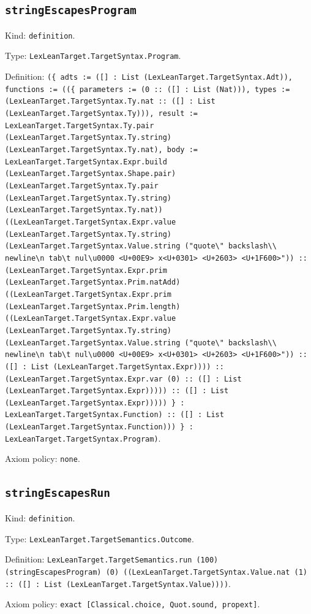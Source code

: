 \documentclass[11pt]{article}
\begin{document}
\subsection*{\texttt{stringEscapesProgram}}
\noindent Kind: \texttt{definition}.\par
\noindent Type: \texttt{LexLeanTarget.TargetSyntax.Program}.\par
\noindent Definition: \texttt{(\{ adts := ([] : List (LexLeanTarget.TargetSyntax.Adt)), functions := ((\{ parameters := (0 :: ([] : List (Nat))), types := (LexLeanTarget.TargetSyntax.Ty.nat :: ([] : List (LexLeanTarget.TargetSyntax.Ty))), result := LexLeanTarget.TargetSyntax.Ty.pair (LexLeanTarget.TargetSyntax.Ty.string) (LexLeanTarget.TargetSyntax.Ty.nat), body := LexLeanTarget.TargetSyntax.Expr.build (LexLeanTarget.TargetSyntax.Shape.pair) (LexLeanTarget.TargetSyntax.Ty.pair (LexLeanTarget.TargetSyntax.Ty.string) (LexLeanTarget.TargetSyntax.Ty.nat)) ((LexLeanTarget.TargetSyntax.Expr.value (LexLeanTarget.TargetSyntax.Ty.string) (LexLeanTarget.TargetSyntax.Value.string ("quote\textbackslash{}" backslash\textbackslash{}\textbackslash{} newline\textbackslash{}n tab\textbackslash{}t nul\textbackslash{}u0000 <U+00E9> x<U+0301> <U+2603> <U+1F600>")) :: (LexLeanTarget.TargetSyntax.Expr.prim (LexLeanTarget.TargetSyntax.Prim.natAdd) ((LexLeanTarget.TargetSyntax.Expr.prim (LexLeanTarget.TargetSyntax.Prim.length) ((LexLeanTarget.TargetSyntax.Expr.value (LexLeanTarget.TargetSyntax.Ty.string) (LexLeanTarget.TargetSyntax.Value.string ("quote\textbackslash{}" backslash\textbackslash{}\textbackslash{} newline\textbackslash{}n tab\textbackslash{}t nul\textbackslash{}u0000 <U+00E9> x<U+0301> <U+2603> <U+1F600>")) :: ([] : List (LexLeanTarget.TargetSyntax.Expr)))) :: (LexLeanTarget.TargetSyntax.Expr.var (0) :: ([] : List (LexLeanTarget.TargetSyntax.Expr))))) :: ([] : List (LexLeanTarget.TargetSyntax.Expr))))) \} : LexLeanTarget.TargetSyntax.Function) :: ([] : List (LexLeanTarget.TargetSyntax.Function))) \} : LexLeanTarget.TargetSyntax.Program)}.\par
\noindent Axiom policy: \texttt{none}.\par
\subsection*{\texttt{stringEscapesRun}}
\noindent Kind: \texttt{definition}.\par
\noindent Type: \texttt{LexLeanTarget.TargetSemantics.Outcome}.\par
\noindent Definition: \texttt{LexLeanTarget.TargetSemantics.run (100) (stringEscapesProgram) (0) ((LexLeanTarget.TargetSyntax.Value.nat (1) :: ([] : List (LexLeanTarget.TargetSyntax.Value))))}.\par
\noindent Axiom policy: \texttt{exact [Classical.choice, Quot.sound, propext]}.\par
\end{document}

